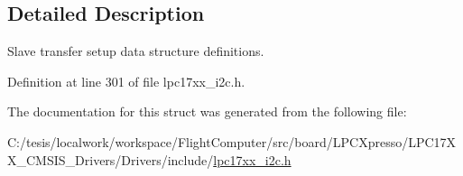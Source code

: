 \subsection{\-Detailed \-Description}
\-Slave transfer setup data structure definitions. 

\-Definition at line 301 of file lpc17xx\-\_\-i2c.\-h.



\-The documentation for this struct was generated from the following file\-:\begin{DoxyCompactItemize}
\item 
\-C\-:/tesis/localwork/workspace/\-Flight\-Computer/src/board/\-L\-P\-C\-Xpresso/\-L\-P\-C17\-X\-X\-\_\-\-C\-M\-S\-I\-S\-\_\-\-Drivers/\-Drivers/include/\hyperlink{lpc17xx__i2c_8h}{lpc17xx\-\_\-i2c.\-h}\end{DoxyCompactItemize}
